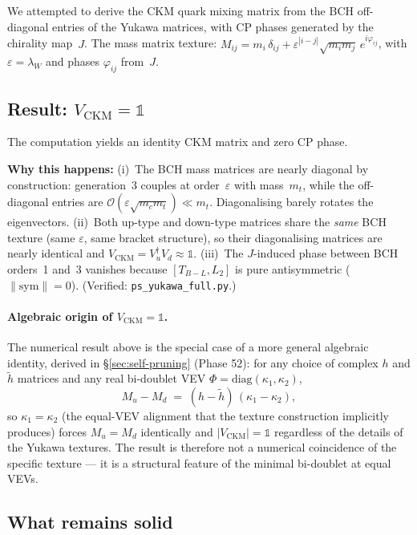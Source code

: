 \documentclass[11pt,a4paper]{article}
\theoremstyle{plain}
\theoremstyle{definition}
\theoremstyle{remark}
\begin{document}
We attempted to derive the CKM quark mixing matrix from the BCH
off-diagonal entries of the Yukawa matrices, with CP phases
generated by the chirality map~$J$.  The mass matrix texture:
$M_{ij} = m_i\,\delta_{ij} + \varepsilon^{|i-j|}\sqrt{m_i m_j}\,e^{i\varphi_{ij}}$,
with $\varepsilon = \lambda_W$ and phases $\varphi_{ij}$ from~$J$.

\subsection*{Result: $V_{\mathrm{CKM}} = \mathbb{1}$}

The computation yields an identity CKM matrix and zero CP phase.

\textbf{Why this happens:}
(i)~The BCH mass matrices are nearly diagonal by construction:
generation~3 couples at order~$\varepsilon$ with mass~$m_t$, while
the off-diagonal entries are $\mathcal{O}(\varepsilon\sqrt{m_c m_t})
\ll m_t$.  Diagonalising barely rotates the eigenvectors.
(ii)~Both up-type and down-type matrices share the \emph{same}
BCH texture (same $\varepsilon$, same bracket structure), so their
diagonalising matrices are nearly identical and
$V_{\mathrm{CKM}} = V_u^\dagger V_d \approx \mathbb{1}$.
(iii)~The $J$-induced phase between BCH orders~1 and~3 vanishes
because $[T_{B{-}L}, L_2]$ is pure antisymmetric
($\|\mathrm{sym}\| = 0$).
(Verified: \texttt{ps\_yukawa\_full.py}.)

\paragraph{Algebraic origin of $V_{\mathrm{CKM}} = \mathbb{1}$.}
The numerical result above is the special case of a more general
algebraic identity, derived in \S\ref{sec:self-pruning} (Phase 52):
for any choice of complex $h$ and $\tilde{h}$ matrices and any real
bi-doublet VEV $\Phi = \mathrm{diag}(\kappa_1, \kappa_2)$,
\begin{equation}
  M_u - M_d \;=\; (h - \tilde{h})\,(\kappa_1 - \kappa_2),
\end{equation}
so $\kappa_1 = \kappa_2$ (the equal-VEV alignment that the texture
construction implicitly produces) forces $M_u = M_d$ identically and
$|V_{\mathrm{CKM}}| = \mathbb{1}$ regardless of the details of the
Yukawa textures.  The result is therefore not a numerical coincidence
of the specific texture --- it is a structural feature of the minimal
bi-doublet at equal VEVs.

\subsection*{What remains solid}
\end{document}
